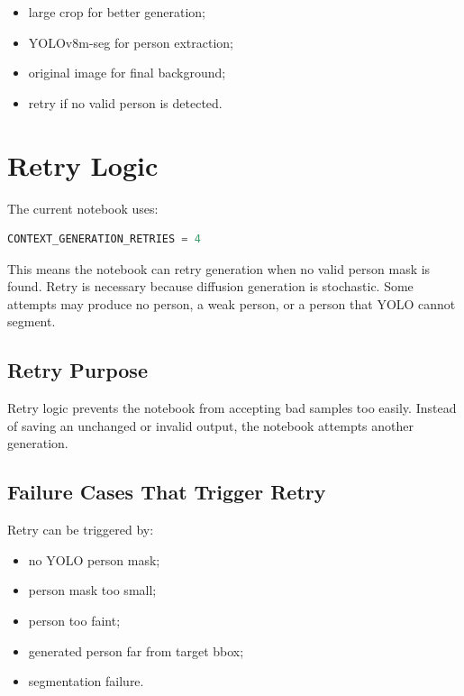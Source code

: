 \documentclass[12pt,a4paper]{article}
\begin{document}
\begin{itemize}
    \item large crop for better generation;
    \item YOLOv8m-seg for person extraction;
    \item original image for final background;
    \item retry if no valid person is detected.
\end{itemize}

\section{Retry Logic}

The current notebook uses:

\begin{lstlisting}[language=Python,caption={Current retry configuration}]
CONTEXT_GENERATION_RETRIES = 4
\end{lstlisting}

This means the notebook can retry generation when no valid person mask is found.
Retry is necessary because diffusion generation is stochastic. Some attempts may
produce no person, a weak person, or a person that YOLO cannot segment.

\subsection{Retry Purpose}

Retry logic prevents the notebook from accepting bad samples too easily.
Instead of saving an unchanged or invalid output, the notebook attempts another
generation.

\subsection{Failure Cases That Trigger Retry}

Retry can be triggered by:

\begin{itemize}
    \item no YOLO person mask;
    \item person mask too small;
    \item person too faint;
    \item generated person far from target bbox;
    \item segmentation failure.
\end{itemize}
\end{document}
